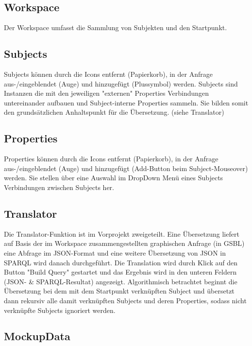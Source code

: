 \subsection*{Workspace}

Der Workspace umfasst die Sammlung von Subjekten und den Startpunkt.

\subsection*{Subjects}

Subjects können durch die Icons entfernt (Papierkorb), in der Anfrage aus-/eingeblendet (Auge) und hinzugefügt (Plussymbol) werden.
Subjects sind Instanzen die mit den jeweiligen "externen" Properties Verbindungen untereinander aufbauen und Subject-interne Properties sammeln. Sie bilden somit den grundsätzlichen
Anhaltspunkt für die Übersetzung. (siehe Translator)

\subsection*{Properties}

Properties können durch die Icons entfernt (Papierkorb), in der Anfrage aus-/eingeblendet (Auge) und hinzugefügt (Add-Button beim Subject-Mouseover) werden.
Sie stellen über eine Auswahl im DropDown Menü eines Subjects Verbindungen zwischen Subjects her.

\subsection*{Translator}

Die Translator-Funktion ist im Vorprojekt zweigeteilt. Eine Übersetzung liefert auf Basis der im Workspace zusammengestellten graphischen Anfrage (in GSBL) eine Abfrage im
JSON-Format und eine weitere Übersetzung von JSON in SPARQL wird danach durchgeführt.
Die Translation wird durch Klick auf den Button "Build Query" gestartet und das Ergebnis wird in den unteren Feldern (JSON- \& SPARQL-Resultat) angezeigt.
Algorithmisch betrachtet beginnt die Übersetzung bei dem mit dem Startpunkt verknüpften Subject und übersetzt dann rekursiv alle damit verknüpften Subjects und deren Properties, sodass nicht verknüpfte Subjects ignoriert werden. 

\subsection*{MockupData}

